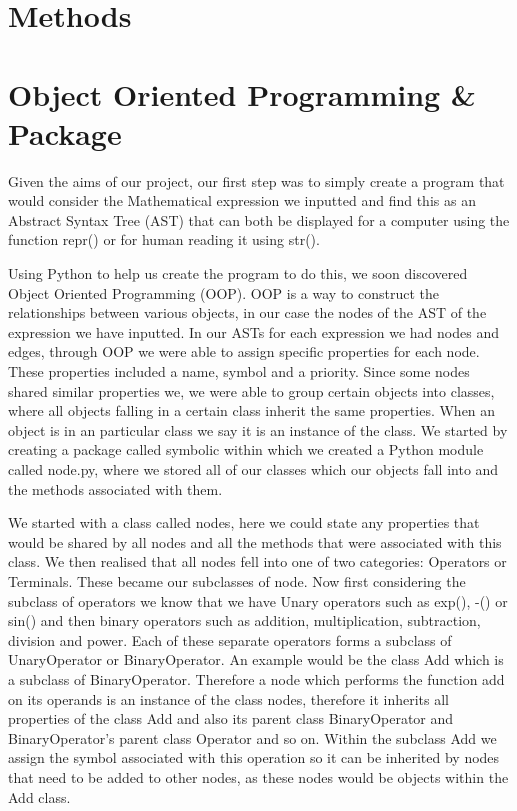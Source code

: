 \documentclass[12pt]{article}
\begin{document}
\section{Methods}


\section{Object Oriented Programming \& Package}
Given the aims of our project, our first step was to simply create a program that would consider the Mathematical expression we inputted and find this as an Abstract Syntax Tree (AST) that can both be displayed for a computer using the function repr() or for human reading it using str(). 

Using Python to help us create the program to do this, we soon discovered Object Oriented Programming (OOP). OOP is a way to construct the relationships between various objects, in our case the nodes of the AST of the expression we have inputted. In our ASTs for each expression we had nodes and edges, through OOP we were able to assign specific properties for each node. These properties included a name, symbol and a priority. Since some nodes shared similar properties we, we were able to group certain objects into classes, where all objects falling in a certain class inherit the same properties. When an object is in an particular class we say it is an instance of the class. We started by creating a package called symbolic within which we created a Python module called node.py, where we stored all of our classes which our objects fall into and the methods associated with them. 

We started with a class called nodes, here we could state any properties that would be shared by all nodes and all the methods that were associated with this class. We then realised that all nodes fell into one of two categories: Operators or Terminals. These became our subclasses of node. Now first considering the subclass of operators we know that we have Unary operators such as exp(), -() or sin() and then binary operators such as addition, multiplication, subtraction, division and power. Each of these separate operators forms a subclass of UnaryOperator or BinaryOperator. An example would be the class Add which is a subclass of BinaryOperator. Therefore a node which performs the function add on its operands is an instance of the class nodes, therefore it inherits all properties of the class Add and also its parent class BinaryOperator and BinaryOperator’s parent class Operator and so on. Within the subclass Add we assign the symbol associated with this operation so it can be inherited by nodes that need to be added to other nodes, as these nodes would be objects within the Add class.
\end{document}
